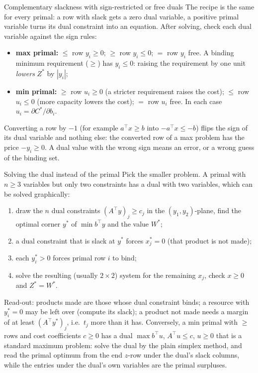 \begin{rulebox}{Complementary slackness with sign-restricted or free duals}
The recipe is the same for every primal: a row with slack gets a zero dual
variable, a positive primal variable turns its dual constraint into an
equation. After solving, check each dual variable against the sign rules:
\begin{itemize}[leftmargin=1.6em,itemsep=0.3ex]
  \item \textbf{max primal:} $\le$ row $y_{i}\ge 0$; $\ge$ row
        $y_{i}\le 0$; $=$ row $y_{i}$ free. A binding minimum requirement
        ($\ge$) has $y_{i}\le 0$: raising the requirement by one unit
        \emph{lowers} $Z^{*}$ by $|y_{i}|$;
  \item \textbf{min primal:} $\ge$ row $u_{i}\ge 0$ (a stricter requirement
        raises the cost); $\le$ row $u_{i}\le 0$ (more capacity lowers the
        cost); $=$ row $u_{i}$ free. In each case $u_{i}=\partial C^{*}/\partial b_{i}$.
\end{itemize}
Converting a row by $-1$ (for example $a^{\top}x\ge b$ into
$-a^{\top}x\le -b$) flips the sign of its dual variable and nothing else:
the converted row of a max problem has the price $-y_{i}\ge 0$. A dual
value with the wrong sign means an error, or a wrong guess of the binding
set.
\end{rulebox}

\begin{rulebox}{Solving the dual instead of the primal}
Pick the smaller problem. A primal with $n\ge 3$ variables but only two
constraints has a dual with two variables, which can be solved
graphically:
\begin{enumerate}[leftmargin=1.8em,itemsep=0.3ex]
  \item draw the $n$ dual constraints $(A^{\top}y)_{j}\ge c_{j}$ in the
        $(y_{1},y_{2})$-plane, find the optimal corner $y^{*}$ of
        $\min b^{\top}y$ and the value $W^{*}$;
  \item a dual constraint that is slack at $y^{*}$ forces $x_{j}^{*}=0$
        (that product is not made);
  \item each $y_{i}^{*}>0$ forces primal row $i$ to bind;
  \item solve the resulting (usually $2\times2$) system for the remaining
        $x_{j}$, check $x\ge 0$ and $Z^{*}=W^{*}$.
\end{enumerate}
Read-out: products made are those whose dual constraint binds; a resource
with $y_{i}^{*}=0$ may be left over (compute its slack); a product not made
needs a margin of at least $(A^{\top}y^{*})_{j}$, i.e.\ $t_{j}$ more than
it has. Conversely, a min primal with $\ge$ rows and cost coefficients
$c\ge 0$ has a dual $\max b^{\top}u$, $A^{\top}u\le c$, $u\ge 0$ that is a
standard maximum problem: solve the dual by the plain
simplex method, and read the primal optimum from the end $z$-row under the
dual's slack columns, while the entries under the dual's own variables are
the primal surpluses.
\end{rulebox}

